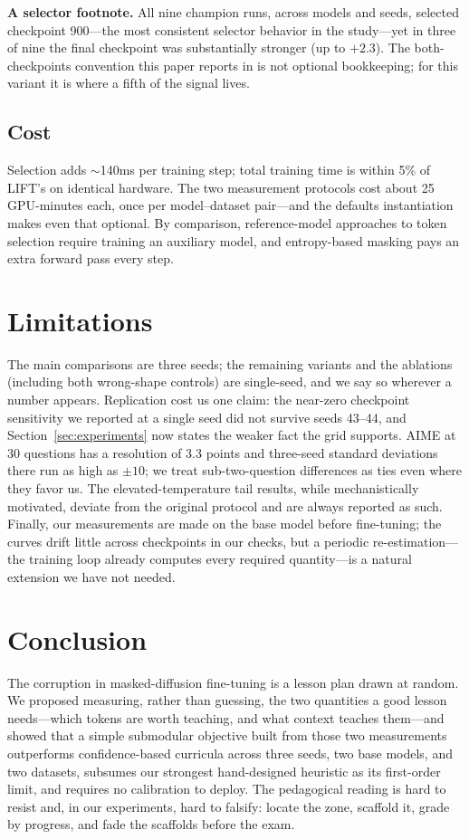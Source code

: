 \documentclass{article} %
\begin{document}
\textbf{A selector footnote.} All nine champion runs, across models and seeds, selected checkpoint 900---the most consistent selector behavior in the study---yet in three of nine the final checkpoint was substantially stronger (up to $+2.3$). The both-checkpoints convention this paper reports in is not optional bookkeeping; for this variant it is where a fifth of the signal lives.

\subsection{Cost}

Selection adds $\sim$140ms per training step; total training time is within 5\% of LIFT's on identical hardware. The two measurement protocols cost about 25 GPU-minutes each, once per model--dataset pair---and the defaults instantiation makes even that optional. By comparison, reference-model approaches to token selection require training an auxiliary model, and entropy-based masking pays an extra forward pass every step.

\section{Limitations}

The main comparisons are three seeds; the remaining variants and the ablations (including both wrong-shape controls) are single-seed, and we say so wherever a number appears. Replication cost us one claim: the near-zero checkpoint sensitivity we reported at a single seed did not survive seeds 43--44, and Section~\ref{sec:experiments} now states the weaker fact the grid supports. AIME at 30 questions has a resolution of 3.3 points and three-seed standard deviations there run as high as $\pm 10$; we treat sub-two-question differences as ties even where they favor us. The elevated-temperature tail results, while mechanistically motivated, deviate from the original protocol and are always reported as such. Finally, our measurements are made on the base model before fine-tuning; the curves drift little across checkpoints in our checks, but a periodic re-estimation---the training loop already computes every required quantity---is a natural extension we have not needed.

\section{Conclusion}

The corruption in masked-diffusion fine-tuning is a lesson plan drawn at random. We proposed measuring, rather than guessing, the two quantities a good lesson needs---which tokens are worth teaching, and what context teaches them---and showed that a simple submodular objective built from those two measurements outperforms confidence-based curricula across three seeds, two base models, and two datasets, subsumes our strongest hand-designed heuristic as its first-order limit, and requires no calibration to deploy. The pedagogical reading is hard to resist and, in our experiments, hard to falsify: locate the zone, scaffold it, grade by progress, and fade the scaffolds before the exam.
\end{document}

